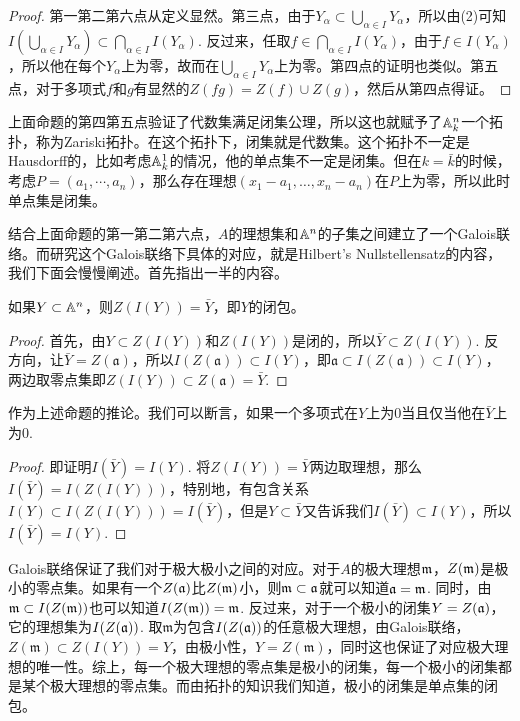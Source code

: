 \begin{proof}
    第一第二第六点从定义显然。第三点，由于$Y_\alpha\subset \bigcup_{\alpha\in I} Y_\alpha$，所以由(2)可知$I\left(\bigcup_{\alpha\in I} Y_\alpha\right)\subset\bigcap_{\alpha\in I} I(Y_\alpha)$. 反过来，任取$f\in \bigcap_{\alpha\in I} I(Y_\alpha)$，由于$f\in I(Y_\alpha)$，所以他在每个$Y_\alpha$上为零，故而在$\bigcup_{\alpha\in I} Y_\alpha$上为零。第四点的证明也类似。第五点，对于多项式$f$和$g$有显然的$Z(fg)=Z(f)\cup Z(g)$，然后从第四点得证。
\end{proof}

上面命题的第四第五点验证了代数集满足闭集公理，所以这也就赋予了$\mathbb{A}^n_k$一个拓扑，称为Zariski拓扑。在这个拓扑下，闭集就是代数集。这个拓扑不一定是Hausdorff的，比如考虑$\mathbb{A}^1_k$的情况，他的单点集不一定是闭集。但在$k=\bar{k}$的时候，考虑$P=(a_1,\cdots ,a_n)$，那么存在理想$(x_1-a_1,\dots,x_n-a_n)$在$P$上为零，所以此时单点集是闭集。

结合上面命题的第一第二第六点，$A$的理想集和$\mathbb{A}^n$的子集之间建立了一个Galois联络。而研究这个Galois联络下具体的对应，就是Hilbert's Nullstellensatz的内容，我们下面会慢慢阐述。首先指出一半的内容。

\begin{pro}
    如果$Y \subset \mathbb{A}^n$，则$Z(I(Y))=\bar{Y}$，即$Y$的闭包。
\end{pro}

\begin{proof} 首先，由$Y\subset Z(I(Y))$和$Z(I(Y))$是闭的，所以$\bar{Y}\subset Z(I(Y))$. 反方向，让$\bar{Y}=Z(\mathfrak{a})$，所以$I(Z(\mathfrak{a}))\subset I(Y)$，即$\mathfrak{a}\subset I(Z(\mathfrak{a}))\subset I(Y)$，两边取零点集即$Z(I(Y))\subset Z(\mathfrak{a})=\bar{Y}$. \end{proof}

作为上述命题的推论。我们可以断言，如果一个多项式在$Y$上为$0$当且仅当他在$\bar{Y}$上为$0$.

\begin{proof} 即证明$I(\bar{Y})=I(Y)$. 将$Z(I(Y))=\bar{Y}$两边取理想，那么$I(\bar{Y})=I(Z(I(Y)))$，特别地，有包含关系$I(Y)\subset I(Z(I(Y)))=I(\bar{Y})$，但是$Y\subset \bar{Y}$又告诉我们$I(\bar{Y})\subset I(Y)$，所以$I(\bar{Y})=I(Y)$. \end{proof}

\para Galois联络保证了我们对于极大极小之间的对应。对于$A$的极大理想$\mathfrak{m}$，$Z(\mathfrak{m})$是极小的零点集。如果有一个$Z(\mathfrak{a})$比$Z(\mathfrak{m})$小，则$\mathfrak{m}\subset \mathfrak{a}$就可以知道$\mathfrak{a}=\mathfrak{m}$. 同时，由$\mathfrak{m} \subset I(Z(\mathfrak{m}))$也可以知道$I(Z(\mathfrak{m}))=\mathfrak{m}$. 反过来，对于一个极小的闭集$Y=Z(\mathfrak{a})$，它的理想集为$I(Z(\mathfrak{a}))$. 取$\mathfrak{m}$为包含$I(Z(\mathfrak{a}))$的任意极大理想，由Galois联络，$Z(\mathfrak{m})\subset Z(I(Y))=Y$，由极小性，$Y=Z(\mathfrak{m})$，同时这也保证了对应极大理想的唯一性。综上，每一个极大理想的零点集是极小的闭集，每一个极小的闭集都是某个极大理想的零点集。而由拓扑的知识我们知道，极小的闭集是单点集的闭包。

